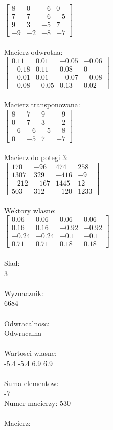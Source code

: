 \documentclass[a4paper,12pt]{article}
\begin{document}
$\begin{bmatrix} 8&0&-6&0\\7&7&-6&-5\\9&3&-5&7\\-9&-2&-8&-7 \end{bmatrix}$
\\
\\
Macierz odwrotna:\\

$\begin{bmatrix} 0.11&0.01&-0.05&-0.06\\-0.18&0.11&0.08&0\\-0.01&0.01&-0.07&-0.08\\-0.08&-0.05&0.13&0.02 \end{bmatrix}$
\\
\\
Macierz transponowana:\\

$\begin{bmatrix} 8&7&9&-9\\0&7&3&-2\\-6&-6&-5&-8\\0&-5&7&-7 \end{bmatrix}$
\\
\\
Macierz do potegi 3:\\

$\begin{bmatrix} 170&-96&474&258\\1307&329&-416&-9\\-212&-167&1445&12\\503&312&-120&1233 \end{bmatrix}$
\\
\\
Wektory wlasne:\\

$\begin{bmatrix} 0.06&0.06&0.06&0.06\\0.16&0.16&-0.92&-0.92\\-0.24&-0.24&-0.1&-0.1\\0.71&0.71&0.18&0.18 \end{bmatrix}$
\\
\\
Slad:\\
3
\\
\\
Wyznacznik:\\
6684
\\
\\
Odwracalnosc:\\
Odwracalna
\\
\\
Wartosci wlasne:\\
-5.4 -5.4 6.9 6.9
\\
\\
Suma elementow:\\
-7
\\
\newpage
Numer macierzy:
530
\\
\\
Macierz:\\
\end{document}
